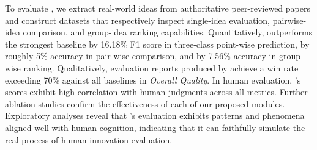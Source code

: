 To evaluate {\ours}, we extract real-world ideas from authoritative peer-reviewed papers and construct datasets that respectively inspect single-idea evaluation, pairwise-idea comparison, and group-idea ranking capabilities.
Quantitatively, {\ours} outperforms the strongest baseline by 16.18\% F1 score in three-class point-wise prediction, by roughly 5\% accuracy in pair-wise comparison, and by 7.56\% accuracy in group-wise ranking.
Qualitatively, evaluation reports produced by {\ours} achieve a win rate exceeding 70\% against all baselines in \textit{Overall Quality}.
In human evaluation, {\ours}'s scores exhibit high correlation with human judgments across all metrics.
Further ablation studies confirm the effectiveness of each of our proposed modules.
Exploratory analyses reveal that {\ours}'s evaluation exhibits patterns and phenomena aligned well with human cognition, indicating that it can faithfully simulate the real process of human innovation evaluation.